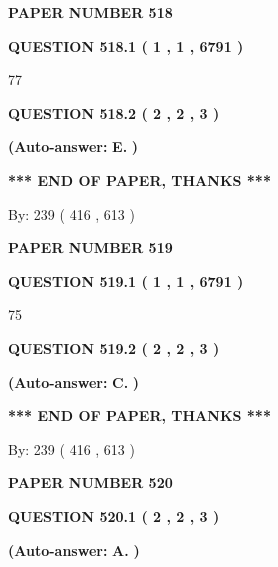 \documentclass[12pt]{article}
\begin{document}
   
\newpage 
\setcounter{page}{ 
   518001 } 
   
   
 {\textbf{ \Large{ PAPER NUMBER  518  }}}
   
   
   
   
  
  
{\textbf{\large{QUESTION
518.1 
 ( 1 , 1 , 6791 )
}}}

77
  
  
{\textbf{\large{QUESTION
518.2 
 ( 2 , 2 , 3 )
}}}
 
 
{\textbf{(Auto-answer:}}
{\textbf{\large{
E.}}}
{\textbf{)}}
 
 
   
   
   
   
\vspace{1.0in} 
{\textbf{\large{ *** END OF PAPER, THANKS *** }}} 
   
   
\hspace{1.0in} By: 
 239 ( 416 ,  613 )
   
   
   
   
\newpage 
\setcounter{page}{ 
   519001 } 
   
   
 {\textbf{ \Large{ PAPER NUMBER  519  }}}
   
   
   
   
  
  
{\textbf{\large{QUESTION
519.1 
 ( 1 , 1 , 6791 )
}}}

75
  
  
{\textbf{\large{QUESTION
519.2 
 ( 2 , 2 , 3 )
}}}
 
 
{\textbf{(Auto-answer:}}
{\textbf{\large{
C.}}}
{\textbf{)}}
 
 
   
   
   
   
\vspace{1.0in} 
{\textbf{\large{ *** END OF PAPER, THANKS *** }}} 
   
   
\hspace{1.0in} By: 
 239 ( 416 ,  613 )
   
   
   
   
\newpage 
\setcounter{page}{ 
   520001 } 
   
   
 {\textbf{ \Large{ PAPER NUMBER  520  }}}
   
   
   
   
  
  
{\textbf{\large{QUESTION
520.1 
 ( 2 , 2 , 3 )
}}}
 
 
{\textbf{(Auto-answer:}}
{\textbf{\large{
A.}}}
{\textbf{)}}
 
 
  
\end{document}
